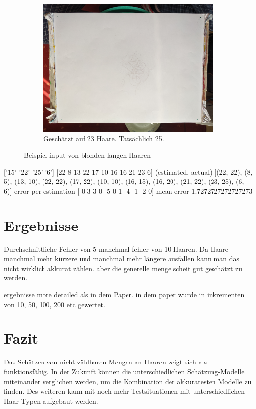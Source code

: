 \documentclass[german,a4paper, 12pt]{llncs}
\begin{document}
\begin{figure}
\begin{subfigure}[b]{0.475\textwidth}
	\end{subfigure}
	\hfill
	\begin{subfigure}[b]{0.475\textwidth} 
		\centering
		\includegraphics[width=\textwidth]{figMama/IMG_20200330_143938_25.jpg}
		\caption[]{Geschätzt auf 23 Haare. Tatsächlich 25.}
		\label{img:tstJan2}
	\end{subfigure}
	\caption[  ]
	{\small Beispiel input von blonden langen Haaren} 
	\label{img:tstJan}
\end{figure}


['15' '22' '25' '6']
[22  8 13 22 17 10 16 16 21 23  6]
(estimated, actual)
[(22, 22), (8, 5), (13, 10), (22, 22), (17, 22), (10, 10), (16, 15), (16, 20), (21, 22), (23, 25), (6, 6)]
error per estimation [ 0  3  3  0 -5  0  1 -4 -1 -2  0]
mean error 1.7272727272727273

\section{Ergebnisse}
Durchschnittliche Fehler von 5 manchmal fehler von 10 Haaren. 
Da Haare manchmal mehr kürzere und manchmal mehr längere ausfallen kann man das nicht wirklich akkurat zählen. aber die generelle menge scheit gut geschätzt zu werden. 

ergebnisse more detailed als in dem Paper. in dem paper wurde in inkrementen von 10, 50, 100, 200 etc gewertet. 

\section{Fazit}
Das Schätzen von nicht zählbaren Mengen an Haaren zeigt sich als funktionsfähig. In der Zukunft können die unterschiedlichen Schätzung-Modelle miteinander verglichen werden, um die Kombination der akkuratesten Modelle zu finden. 
Des weiteren kann mit noch mehr Testsituationen mit unterschiedlichen Haar Typen aufgebaut werden. 
\end{document}
